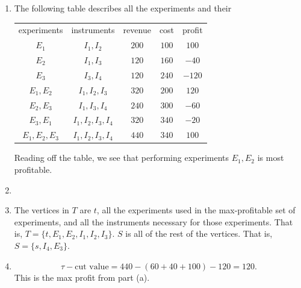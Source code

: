\documentclass[12 pt, letterpaper]{hmcpset}
\begin{document}
\begin{solution}
	\begin{enumerate}
		\item The following table describes all the experiments and their 
			\begin{center}
				\begin{tabular}{c | c | c | c | c}
					experiments & instruments & revenue & cost & profit \\
					$E_{1}$ & $ I_{1}, I_{2} $ & $200$ &  $100$ &  $100$ \\
					$E_{2}$ & $ I_{1}, I_{3} $ & $120$ & $160$ & $-40$ \\
					$E_{3}$ & $ I_{3}, I_{4}$ & $120$ & $240$ & $-120$ \\
					$E_{1}, E_{2}$ & $I_{1}, I_{2}, I_{3}$ & $320$ & $200$ & $120$ \\
					$E_{2}, E_{3}$ & $I_{1}, I_{3}, I_{4}$ & $240$ & $300$ & $-60$ \\
					$E_{3}, E_{1}$ & $I_{1}, I_{2}, I_{3}, I_{4}$ & $320$ & $340$ & $-20$ \\
					$E_{1}, E_{2}, E_{3}$ & $I_{1}, I_{2}, I_{3}, I_{4}$ & $440$ & $340$ & $100$
				\end{tabular}
			\end{center}
			Reading off the table, we see that performing experiments $E_{1}, E_{2}$ is most profitable.

		\item

		\item The vertices in $T$ are $t$, all the experiments used in the max-profitable set of experiments, and all the instruments necessary for those experiments. That is, $T = \{ t, E_{1}, E_{2}, I_{1}, I_{2}, I_{3} \}$. $S$ is all of the rest of the vertices. That is, $S = \{ s, I_{4}, E_{3} \}$.

		\item
			\[
				\tau - \text{cut value} = 440 - (60 + 40 + 100) - 120 = 120.
			\]
			This is the max profit from part (a).
	\end{enumerate}
\end{solution}

\pagebreak
\end{document}
